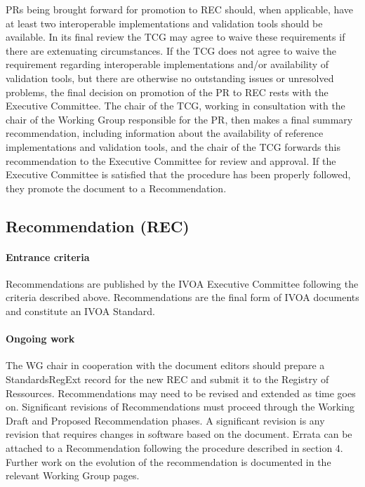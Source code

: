 \documentclass[11pt,a4paper]{ivoa}
\begin{document}
PRs being brought forward for promotion to REC should, when applicable,
have at least two interoperable implementations and validation tools
should be available.  In its final review the TCG may agree to waive
these requirements if there are extenuating circumstances.  If the TCG
does not agree to waive the requirement regarding interoperable
implementations and/or availability of validation tools, but there are
otherwise no outstanding issues or unresolved problems, the final
decision on promotion of the PR to REC rests with the Executive
Committee.  The chair of the TCG, working in consultation with the chair
of the Working Group responsible for the PR, then makes a final summary
recommendation, including information about the availability of
reference implementations and validation tools, and the chair of the TCG
forwards this recommendation to the Executive Committee for review and
approval. If the Executive Committee is satisfied that the procedure has
been properly followed, they promote the document to a Recommendation.

\subsection{Recommendation (REC)}

\paragraph{Entrance criteria}  Recommendations are published by the IVOA Executive
Committee following the criteria described above.  Recommendations are
the final form of IVOA documents and constitute an IVOA Standard.

\paragraph{Ongoing work}   The WG chair in cooperation with the document editors
should prepare a StandardsRegExt record for the new REC and submit it to
the Registry of Ressources.  Recommendations may need to be revised and
extended as time goes on.  Significant revisions of Recommendations must
proceed through the Working Draft and Proposed Recommendation phases.  A
significant revision is any revision that requires changes in software
based on the document. Errata can be attached to a Recommendation
following the procedure described in section 4. Further work on the
evolution of the recommendation is documented in the relevant Working
Group pages.
\end{document}
